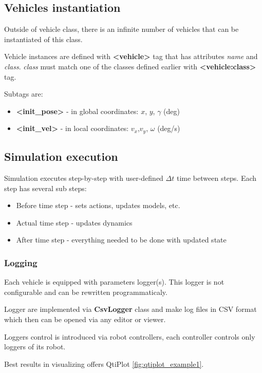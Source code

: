 \documentclass[a4paper,11pt]{article}
\begin{document}
\subsection{Vehicles instantiation}
Outside of vehicle class, there is an infinite number of vehicles that can be instantiated of this class. 

Vehicle instances are defined with \textbf{\textless vehicle\textgreater} tag that has attributes \textit{name} and \textit{class}. \textit{class} must match one of the classes defined earlier with \textbf{\textless vehicle:class\textgreater} tag.

Subtags are:
\begin{itemize}
	\item \textbf{\textless init\_pose\textgreater} - in global coordinates: $x$, $y$, $\gamma$ (deg)
	\item \textbf{\textless init\_vel\textgreater} - in local coordinates: $v_x$,$v_y$, $\omega$ (deg/s)
\end{itemize}

\subsection{Simulation execution}
Simulation executes step-by-step with user-defined $\Delta t$ time between steps.
Each step has several sub steps:
\begin{itemize}
\item Before time step - sets actions, updates models, etc.
\item Actual time step - updates dynamics
\item After time step - everything needed to be done with updated state
\end{itemize}

\subsubsection{Logging}

Each vehicle is equipped with parameters logger(s). This logger is not configurable and can be rewritten programmaticaly. 

Logger are implemented via \textbf{CsvLogger} class and make log files in CSV format which then can be opened via any editor or viewer. 

Loggers control is introduced via robot controllers, each controller controls only loggers of its robot. 

Best results in visualizing offers QtiPlot \ref{fig:qtiplot_example1}.
\end{document}
